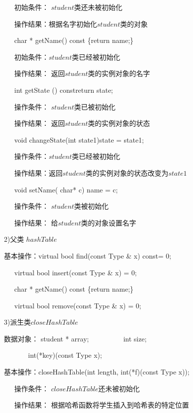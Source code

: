 \documentclass[paper=a4,UTF8,fontsize=11pt]{scrartcl} %
\numberwithin{equation}{section} %
\numberwithin{figure}{section} %
\numberwithin{table}{section} %
\begin{document}
\qquad \qquad \quad \ \ \ 初始条件：	$student$类还未被初始化

\qquad \qquad \quad \ \ \ 操作结果：根据名字初始化$student$类的对象

\qquad \qquad \quad \ \ \ char * getName() const \{return name;\}

\qquad \qquad \quad \ \ \ 初始条件：$student$类已经被初始化

\qquad \qquad \quad \ \ \ 操作结果： 返回$student$类的实例对象的名字

\qquad \qquad \quad \ \ \      int getState () const{return state;}

\qquad \qquad \quad \ \ \  操作条件： $student$类已被初始化

\qquad \qquad \quad \ \ \ 操作结果： 返回$student$类的实例对象的状态

\qquad \qquad \quad \ \ \ void changeState(int state1){state = state1;}

\qquad \qquad \quad \ \ \ 操作条件：$student$类已经被初始化 

\qquad \qquad \quad \ \ \ 操作结果：返回$student$类的实例对象的状态改变为$state1$

\qquad \qquad \quad \ \ \     void setName( char* c)	{name = c;}

\qquad \qquad \quad \ \ \ 操作条件： $student$类被初始化 

\qquad \qquad \quad \ \ \ 操作结果： 给$student$类的对象设置名字
\vspace{0.2cm}

2)父类 $hashTable$

基本操作：virtual bool find(const Type \& x) const= 0;

\qquad \qquad \quad \ \ \   virtual bool insert(const Type \& x) = 0;

\qquad \qquad \quad \ \ \ char * getName() const \{return name;\}

\qquad \qquad \quad \ \ \      virtual bool remove(const Type \& x) = 0;
\vspace{0.2cm}

3)派生类$closeHashTable$

数据对象： student * array;\ \ \ \ \ \ \ \ \ \ \qquad     int size;

 \qquad \qquad \ \ \ \ \ \ \  int(*key)(const Type x);

基本操作：closeHashTable(int length, int(*f)(const Type x));

\qquad \qquad \quad \ \ \ 操作条件： $closeHashTable$还未被初始化

\qquad \qquad \quad \ \ \ 操作结果： 根据哈希函数将学生插入到哈希表的特定位置
\end{document}
